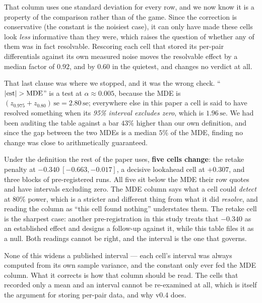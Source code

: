 \documentclass[11pt,letterpaper]{article}
\begin{document}
That column uses one standard deviation for every row, and we now know it is a
property of the comparison rather than of the game. Since the correction is
conservative (the constant is the noisiest case), it can only have made
these cells look \emph{less} informative than they were, which raises the
question of whether any of them was in fact resolvable. Rescoring each cell that
stored its per-pair differentials against its own measured noise moves the
resolvable effect by a median factor of $0.92$, and by $0.60$ in the quietest,
and changes no verdict at all.

That last clause was where we stopped, and it was the wrong check. ``$|{\rm
est}| > {\rm MDE}$'' is a test at $\alpha \approx 0.005$, because the MDE is
$(z_{0.975} + z_{0.80})\,\mathrm{se} = 2.80\,\mathrm{se}$; everywhere else in
this paper a cell is said to have resolved something when its \emph{95\%
interval excludes zero}, which is $1.96\,\mathrm{se}$. We had been auditing the
table against a bar $43\%$ higher than our own definition, and since the gap
between the two MDEs is a median $5\%$ of the MDE, finding no change was close
to arithmetically guaranteed.

Under the definition the rest of the paper uses, \textbf{five cells change}: the
retake penalty at $-0.340\ [-0.663, -0.017]$, a decisive lookahead cell at
$+0.307$, and three blocks of pre-registered runs. All five sit below the MDE
their row quotes and have intervals excluding zero. The MDE column says what a
cell could \emph{detect} at $80\%$ power, which is a stricter and different thing
from what it did \emph{resolve}, and reading the column as ``this cell found
nothing'' understates them. The retake cell is the sharpest case: another
pre-registration in this study treats that $-0.340$ as an established effect and
designs a follow-up against it, while this table files it as a null. Both
readings cannot be right, and the interval is the one that governs.

None of this widens a published interval --- each cell's interval was always
computed from its own sample variance, and the constant only ever fed the MDE
column. What it corrects is how that column should be read. The cells that
recorded only a mean and an interval cannot be re-examined at all, which is
itself the argument for storing per-pair data, and why v0.4 does.
\end{document}
